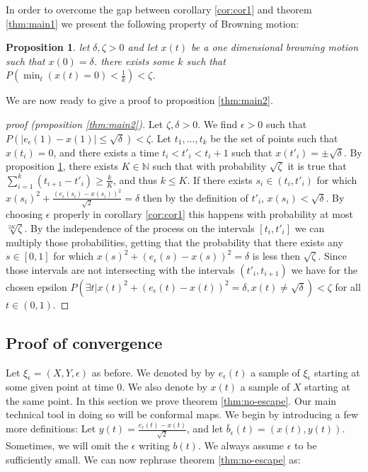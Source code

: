 \documentclass[11pt]{article}
\newtheorem{propos}{Proposition}
\begin{document}
{In order to overcome the gap between corollary \ref{cor:cor1} and
theorem \ref{thm:main1} we present the following property of Browning
motion:
\begin{propos}\label{prop:prop1}
let $\delta,\zeta>0$ and let $x(t)$ be a one dimensional browning
motion such that $x(0)=\delta$. there exists some $k$ such that
$P(\min_t(x(t)=0)<\frac1k)<\zeta$.
\end{propos}

We are now ready to give a proof to proposition \ref{thm:main2}.

\begin{proof}[proof (proposition \ref{thm:main2})]
Let $\zeta,\delta>0$. We find $\epsilon>0$ such that
$P(|e_\epsilon(1)- x(1)|\le\sqrt\delta)<\zeta$. Let $t_1,...,t_k$ be
the set of points such that $x(t_i)=0$, and there exists a time
$t_i<t'_i<t_i+1$ such that $x(t'_i)=\pm\sqrt\delta$. By proposition
\ref{prop:prop1}, there exists $K\in\mathbb{N}$ such that with
probability $\sqrt\zeta$ it is true that
$\sum_{i=1}^k(t_{i+1}-t'_i)\ge\frac{k}{K}$, and thus $k\le K$. If there exists
$s_i\in (t_i, t'_i)$ for which
$x(s_i)^2+\frac{(e_\epsilon(s_i)-x(s_i))^2}{\sqrt2}=\delta$ then by the definition of
$t'_i$, $x(s_i)<\sqrt\delta$. By choosing $\epsilon$ properly in
corollary \ref{cor:cor1} this happens with probability at most
$\sqrt[2K]{\zeta}$. By the independence of the process on the intervals
$[t_i,t'_i]$ we can multiply those probabilities, getting that the
probability that there exists any $s\in[0,1]$ for which
$x(s)^2+(e_\epsilon(s)-x(s))^2=\delta$ is less then
$\sqrt\zeta$. Since those intervals are not intersecting with the
intervals $(t'_i,t_{i+1})$ we have for the chosen epsilon $P(\exists t
| x(t)^2+(e_\epsilon(t)-x(t))^2=\delta, x(t)\neq \sqrt \delta)<\zeta$
for all $t\in(0,1)$.
\end{proof}

\subsection{Proof of convergence}\label{sec:POC}
Let $\xi_\epsilon=(X,Y,\epsilon)$ as before. We denoted by by $e_\epsilon(t)$ a sample of $\xi_\epsilon$
starting at some given point at time $0$. We also denote by $x(t)$ a
sample of $X$ starting at the same point.  In this section we prove
theorem \ref{thm:no-escape}. Our main technical tool in doing so will
be conformal maps. We begin by introducing a few more definitions: Let
$y(t)=\frac{e_\epsilon(t)-x(t)}{\sqrt2}$, and let
$\bar{b}_\epsilon(t)=(x(t),y(t))$. Sometimes, we will omit the $\epsilon$ writing $b(t)$. We always assume $\epsilon$ 
to be sufficiently small. We can now rephrase theorem
\ref{thm:no-escape} as:

}
\end{document}
